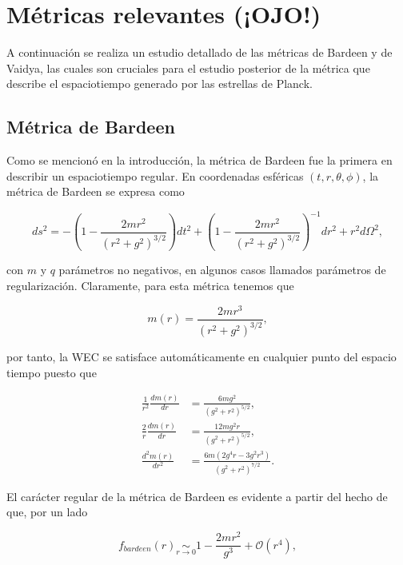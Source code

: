 \documentclass{article}
\numberwithin{equation}{section}
\theoremstyle{definition}
\begin{document}
\section{\label{previous metrics section} Métricas relevantes (¡OJO!)}

A continuación se realiza un estudio detallado de las métricas de Bardeen y de Vaidya, las cuales son cruciales para el estudio posterior de la métrica que describe el espaciotiempo generado por las estrellas de Planck.

\subsection{\label{bardeen section} Métrica de Bardeen}

Como se mencionó en la introducción, la métrica de Bardeen \cite{bardeen} fue la primera en describir un espaciotiempo regular. En coordenadas esféricas $(t,r,\theta,\phi)$, la métrica de Bardeen se expresa como

\begin{equation}
\label{bardeen metric}
ds^2 = -\left( 1 - \frac{2mr^2}{(r^2 + g^2)^{3/2}} \right)dt^2 + \left( 1 - \frac{2mr^2}{(r^2 + g^2)^{3/2}} \right)^{-1}dr^2 + r^2d\Omega^2,
\end{equation}

con $m$ y $q$ parámetros no negativos, en algunos casos llamados parámetros de regularización. Claramente, para esta métrica tenemos que 

\begin{equation}
m(r) = \frac{2mr^3}{(r^2 + g^2)^{3/2}},
\end{equation}

por tanto, la WEC se satisface automáticamente en cualquier punto del espacio tiempo puesto que 

\begin{align}
\frac{1}{r^2}\frac{dm(r)}{dr} &= \frac{6 m g^2}{\left(g^2+r^2\right)^{5/2}},\\
\frac{2}{r}\frac{dm(r)}{dr} &= \frac{12 m g^2 r}{\left(g^2+r^2\right)^{5/2}},\\
\frac{d^2m(r)}{dr^2} &= \frac{6 m \left(2 g^4 r-3 g^2 r^3\right)}{\left(g^2+r^2\right)^{7/2}}.
\end{align}

El carácter regular de la métrica de Bardeen es evidente a partir del hecho de que, por un lado

\begin{equation}
f_{bardeen}(r) \underset{r \to 0}{\sim} 1 - \frac{2mr^2}{g^3} + \mathcal{O}(r^4),
\end{equation}
\end{document}
